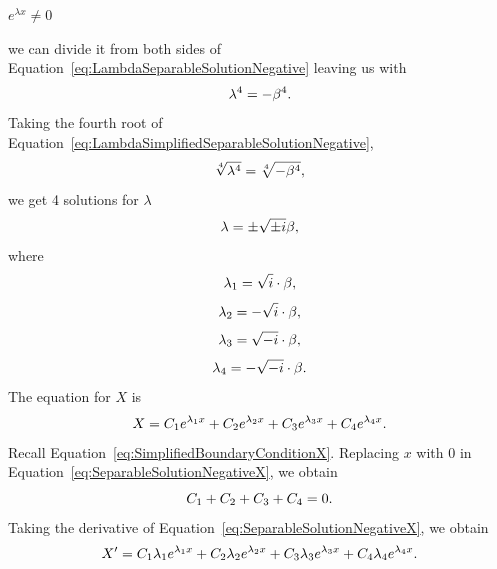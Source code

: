 \documentclass[12pt]{article}
\begin{document}
\centerline{$e^{\lambda x}\neq0$}

we can divide it from both sides of Equation~\eqref{eq:LambdaSeparableSolutionNegative} leaving us with
\begin{equation}\label{eq:LambdaSimplifiedSeparableSolutionNegative}
    \centering
    \lambda^4 = -\beta^4.
\end{equation}
Taking the fourth root of Equation~\eqref{eq:LambdaSimplifiedSeparableSolutionNegative},
\begin{equation}\label{eq:FourthRootLambdaSimplifiedSeparableSolutionNegative}
    \centering
    \sqrt[4]{\lambda^4} = \sqrt[4]{-\beta^4},
\end{equation}
we get 4 solutions for $\lambda$
\begin{equation}\label{eq:FourSolutionsLambda}
    \centering
    \lambda = \pm\sqrt{\pm i}\beta,
\end{equation}
where
\begin{equation}\label{eq:SolutionLambda1}
    \centering
    \lambda_1 = \sqrt{i}\cdot\beta,
\end{equation}
\begin{equation}\label{eq:SolutionLambda2}
    \centering
    \lambda_2 = -\sqrt{i}\cdot\beta,
\end{equation}
\begin{equation}\label{eq:SolutionLambda3}
    \centering
    \lambda_3 = \sqrt{-i}\cdot\beta,
\end{equation}
\begin{equation}\label{eq:SolutionLambda4}
    \centering
    \lambda_4 = -\sqrt{-i}\cdot\beta.
\end{equation}
The equation for $X$ is
\begin{equation}\label{eq:SeparableSolutionNegativeX}
    \centering
    X = C_1e^{\lambda_1x}+C_2e^{\lambda_2x}+C_3e^{\lambda_3x}+C_4e^{\lambda_4x}.
\end{equation}
Recall Equation~\eqref{eq:SimplifiedBoundaryConditionX}. Replacing $x$ with $0$ in Equation~\eqref{eq:SeparableSolutionNegativeX}, we obtain
\begin{equation}\label{eq:SimplifiedSeparableSolutionNegativeX}
    \centering
    C_1+C_2+C_3+C_4 = 0.
\end{equation}
Taking the derivative of Equation~\eqref{eq:SeparableSolutionNegativeX}, we obtain
\begin{equation}\label{eq:SeparableSolutionNegativeX'}
    \centering
    X' = C_1\lambda_1e^{\lambda_1x}+C_2\lambda_2e^{\lambda_2x}+C_3\lambda_3e^{\lambda_3x}+C_4\lambda_4e^{\lambda_4x}.
\end{equation}
\end{document}
